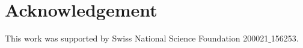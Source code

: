 \section{Acknowledgement}
\label{sec:acknowledgement}

This work was supported by Swiss National Science Foundation 200021$\_$156253.



\newpage

%




\begin{figure}[tbp]
  \centering

  
 
 

\end{figure}

